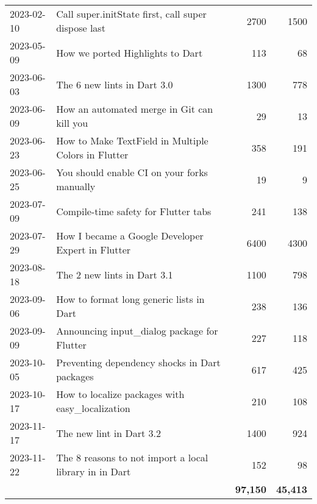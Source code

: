\begin{longtable}{|l|l|r|r|}
    2023-02-10 & Call super.initState first, call super dispose last & 2700 & 1500\\
    2023-05-09 & How we ported Highlights to Dart & 113 & 68\\
    2023-06-03 & The 6 new lints in Dart 3.0 & 1300 & 778\\
    2023-06-09 & How an automated merge in Git can kill you & 29 & 13\\
    2023-06-23 & How to Make TextField in Multiple Colors in Flutter & 358 & 191\\
    2023-06-25 & You should enable CI on your forks manually & 19 & 9\\
    2023-07-09 & Compile-time safety for Flutter tabs & 241 & 138\\
    2023-07-29 & How I became a Google Developer Expert in Flutter & 6400 & 4300\\
    2023-08-18 & The 2 new lints in Dart 3.1 & 1100 & 798\\
    2023-09-06 & How to format long generic lists in Dart & 238 & 136\\
    2023-09-09 & Announcing input\_dialog package for Flutter & 227 & 118\\
    2023-10-05 & Preventing dependency shocks in Dart packages & 617 & 425\\
    2023-10-17 & How to localize packages with easy\_localization & 210 & 108\\
    2023-11-17 & The new lint in Dart 3.2 & 1400 & 924\\
    2023-11-22 & The 8 reasons to not import a local library in in Dart & 152 & 98\\
    \hline
    & & \textbf{97,150} & \textbf{45,413}\\
    \hline
\end{longtable}

\pagebreak
